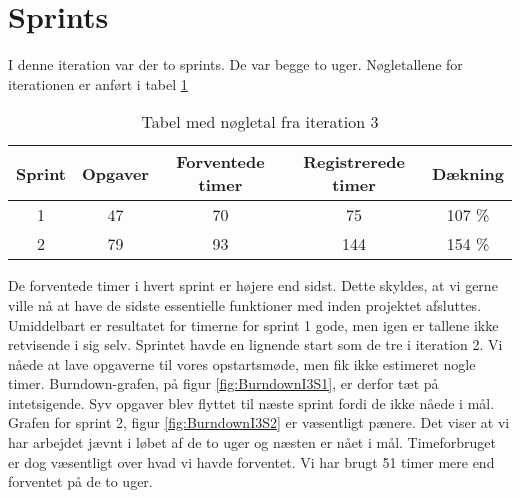 \section{Sprints}

I denne iteration var der to sprints. De var begge to uger.
Nøgletallene for iterationen er anført i tabel \ref{table:iteration3sprints}

\begin{table}
\centering
\begin{tabular}{|c|c|c|c|c|}
\hline 
\textbf{Sprint} 	& \textbf{Opgaver} 	& \textbf{Forventede timer} 	& \textbf{Registrerede timer} 	& \textbf{Dækning} \\ 
\hline
1 		& 47 		& 70 				& 75						& 107 \% \\ 
\hline 
2 		& 79 		& 93 				& 144					&  154 \% \\ 
\hline 
\end{tabular}
\caption{Tabel med nøgletal fra iteration 3}
\label{table:iteration3sprints}
\end{table}

De forventede timer i hvert sprint er højere end sidst. Dette skyldes, at vi gerne ville nå at have de sidste essentielle funktioner med inden projektet afsluttes. Umiddelbart er resultatet for timerne for sprint 1 gode, men igen er tallene ikke retvisende i sig selv. Sprintet havde en lignende start som de tre i iteration 2. Vi nåede at lave opgaverne til vores opstartsmøde, men fik ikke estimeret nogle timer. Burndown-grafen, på figur \ref{fig:BurndownI3S1}, er derfor tæt på intetsigende. Syv opgaver blev flyttet til næste sprint fordi de ikke nåede i mål. Grafen for sprint 2, figur \ref{fig:BurndownI3S2} er væsentligt pænere. Det viser at vi har arbejdet jævnt i løbet af de to uger og næsten er nået i mål. Timeforbruget er dog væsentligt over hvad vi havde forventet. Vi har brugt 51 timer mere end forventet på de to uger.

\begin{minipage}{0.5\textwidth}
\end{minipage}
\begin{minipage}{0.5\textwidth}
\end{minipage}
